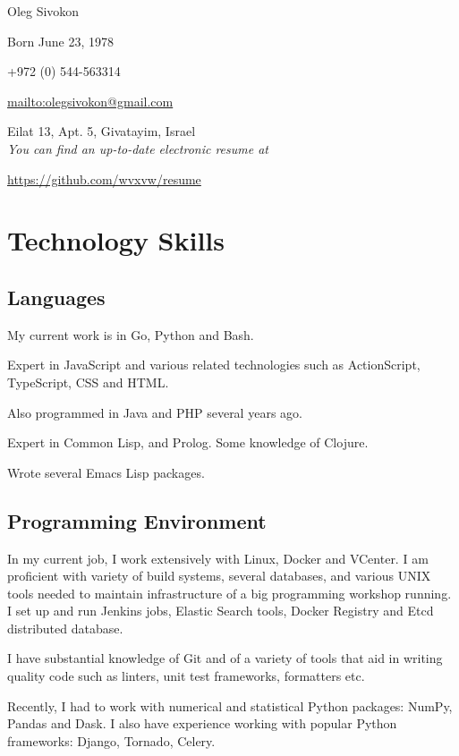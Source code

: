 \documentclass[11pt]{article}
\author{Oleg Sivokon}
\date{\textit{<2017-02-23>}}
\title{}
\begin{document}
\begin{center}
Oleg Sivokon

Born June 23, 1978

+972 (0) 544-563314

\url{mailto:olegsivokon@gmail.com}

Eilat 13, Apt. 5, Givatayim, Israel \\[18pt]

\small \emph{You can find an up-to-date electronic resume at}

\url{https://github.com/wvxvw/resume} \\[48pt]
\end{center}

\section*{Technology Skills}
\label{sec-1}
\subsection*{Languages}
\label{sec-1-1}
My current work is in Go, Python and Bash.

Expert in JavaScript and various related technologies such as
ActionScript, TypeScript, CSS and HTML.

Also programmed in Java and PHP several years ago.

Expert in Common Lisp, and Prolog.  Some knowledge of Clojure.

Wrote several Emacs Lisp packages.

\subsection*{Programming Environment}
\label{sec-1-2}
In my current job, I work extensively with Linux, Docker and
VCenter.  I am proficient with variety of build systems, several
databases, and various UNIX tools needed to maintain infrastructure
of a big programming workshop running.  I set up and run Jenkins
jobs, Elastic Search tools, Docker Registry and Etcd distributed
database.

I have substantial knowledge of Git and of a variety of tools that
aid in writing quality code such as linters, unit test frameworks,
formatters etc.

Recently, I had to work with numerical and statistical Python
packages: NumPy, Pandas and Dask.  I also have experience working
with popular Python frameworks: Django, Tornado, Celery.
\end{document}
